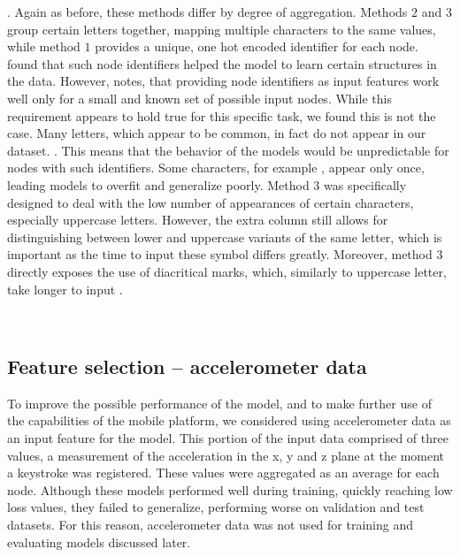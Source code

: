 .
Again as before, these methods differ by degree of aggregation. Methods $2$ and $3$ group certain letters together, mapping multiple characters to the same values, while method $1$ provides a unique, one hot encoded identifier for each node.  found that such node identifiers helped the model to learn certain structures in the data. However,  notes, that providing node identifiers as input features work well only for a small and known set of possible input nodes. While this requirement appears to hold true for this specific task, we found this is not the case. Many letters, which appear to be common, in fact do not appear in our dataset. . This means that the behavior of the models would be unpredictable for nodes with such identifiers.
Some characters, for example , appear only once, leading models to overfit and generalize poorly.
Method $3$ was specifically designed to deal with the low number of appearances of certain characters, especially uppercase letters. However, the extra column still allows for distinguishing between lower and uppercase variants of the same letter, which is important as the time to input these symbol differs greatly. 
Moreover, method $3$ directly exposes the use of diacritical marks, which, similarly to uppercase letter, take longer to input . 

\\


\subsection{Feature selection -- accelerometer data} \label{accel_subsection}
To improve the possible performance of the model, and to make further use of the capabilities of the mobile platform, we considered using accelerometer data as an input feature for the model. 
This portion of the input data comprised of three values, a measurement of the acceleration in the x, y and z plane at the moment a keystroke was registered. 
These values were aggregated as an average for each node. Although these models performed well during training, quickly reaching low loss values, they failed to generalize, performing worse on validation and test datasets. For this reason, accelerometer data was not used for training and evaluating models discussed later.



